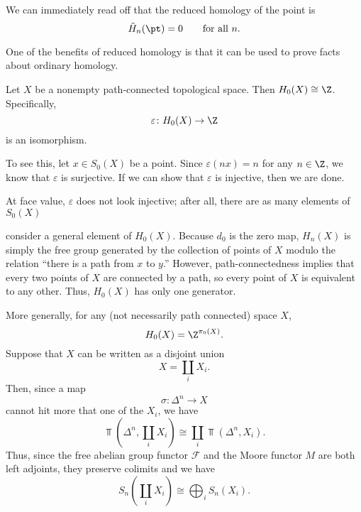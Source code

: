 \documentclass[main.tex]{subfiles}
\begin{document}
\begin{example}
 We can immediately read off that the reduced homology of the point is
  \begin{equation*}
    \tilde{H}_{n}(\pt) = 0\qquad \text{for all }n.
  \end{equation*}
\end{example}

One of the benefits of reduced homology is that it can be used to prove facts about ordinary homology.
\begin{example}
  Let $X$ be a nonempty path-connected topological space. Then $H_{0}(X) \cong \Z$. Specifically,
  \begin{equation*}
    \varepsilon\colon H_{0}(X) \to \Z
  \end{equation*}
  is an isomorphism.

  To see this, let $x \in S_{0}(X)$ be a point. Since $\varepsilon(nx) = n$ for any $n \in \Z$, we know that $\varepsilon$ is surjective. If we can show that $\varepsilon$ is injective, then we are done.

  At face value, $\varepsilon$ does not look injective; after all, there are as many elements of $S_{0}(X)$

  consider a general element of $H_{0}(X)$. Because $d_{0}$ is the zero map, $H_{n}(X)$ is simply the free group generated by the collection of points of $X$ modulo the relation ``there is a path from $x$ to $y$.'' However, path-connectedness implies that every two points of $X$ are connected by a path, so every point of $X$ is equivalent to any other. Thus, $H_{0}(X)$ has only one generator.
\end{example}

\begin{example}
  More generally, for any (not necessarily path connected) space $X$,
  \begin{equation*}
    H_{0}(X) = \Z^{\pi_{0}(X)}.
  \end{equation*}
  Suppose that $X$ can be written as a disjoint union
  \begin{equation*}
    X = \coprod_{i} X_{i}.
  \end{equation*}
  Then, since a map
  \begin{equation*}
    \sigma\colon \Delta^{n} \to X
  \end{equation*}
  cannot hit more that one of the $X_{i}$, we have
  \begin{equation*}
    \Top\left(\Delta^{n}, \coprod_{i} X_{i}\right) \cong \coprod_{i} \Top(\Delta^{n}, X_{i}).
  \end{equation*}
  Thus, since the free abelian group functor $\mathcal{F}$ and the Moore functor $M$ are both left adjoints, they preserve colimits and we have
  \begin{equation*}
    S_{n}\left(\coprod_{i} X_{i}\right) \cong \bigoplus_{i} S_{n}(X_{i}).
  \end{equation*}
\end{example}
\end{document}
